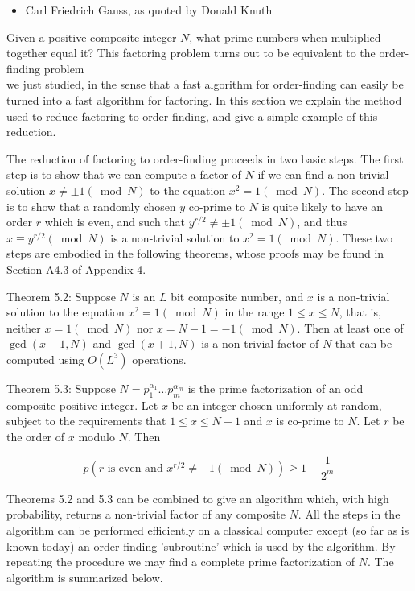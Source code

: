 \begin{itemize}
    \item Carl Friedrich Gauss, as quoted by Donald Knuth
\end{itemize}

Given a positive composite integer $N$, what prime numbers when multiplied together equal it? This factoring problem turns out to be equivalent to the order-finding problem\\
we just studied, in the sense that a fast algorithm for order-finding can easily be turned into a fast algorithm for factoring. In this section we explain the method used to reduce factoring to order-finding, and give a simple example of this reduction.

The reduction of factoring to order-finding proceeds in two basic steps. The first step is to show that we can compute a factor of $N$ if we can find a non-trivial solution $x \neq \pm 1(\bmod N)$ to the equation $x^{2}=1(\bmod N)$. The second step is to show that a randomly chosen $y$ co-prime to $N$ is quite likely to have an order $r$ which is even, and such that $y^{r / 2} \neq \pm 1(\bmod N)$, and thus $x \equiv y^{r / 2}(\bmod N)$ is a non-trivial solution to $x^{2}=1(\bmod N)$. These two steps are embodied in the following theorems, whose proofs may be found in Section A4.3 of Appendix 4.

Theorem 5.2: Suppose $N$ is an $L$ bit composite number, and $x$ is a non-trivial solution to the equation $x^{2}=1(\bmod N)$ in the range $1 \leq x \leq N$, that is, neither $x=1(\bmod N)$ nor $x=N-1=-1(\bmod N)$. Then at least one of $\operatorname{gcd}(x-1, N)$ and $\operatorname{gcd}(x+1, N)$ is a non-trivial factor of $N$ that can be computed using $O\left(L^{3}\right)$ operations.

Theorem 5.3: Suppose $N=p_{1}^{\alpha_{1}} \ldots p_{m}^{\alpha_{m}}$ is the prime factorization of an odd composite positive integer. Let $x$ be an integer chosen uniformly at random, subject to the requirements that $1 \leq x \leq N-1$ and $x$ is co-prime to $N$. Let $r$ be the order of $x$ modulo $N$. Then

\begin{equation}
    p\left(r \text { is even and } x^{r / 2} \neq-1(\bmod N)\right) \geq 1-\frac{1}{2^{m}} \tag{5.60}
\end{equation}

Theorems 5.2 and 5.3 can be combined to give an algorithm which, with high probability, returns a non-trivial factor of any composite $N$. All the steps in the algorithm can be performed efficiently on a classical computer except (so far as is known today) an order-finding 'subroutine' which is used by the algorithm. By repeating the procedure we may find a complete prime factorization of $N$. The algorithm is summarized below.


